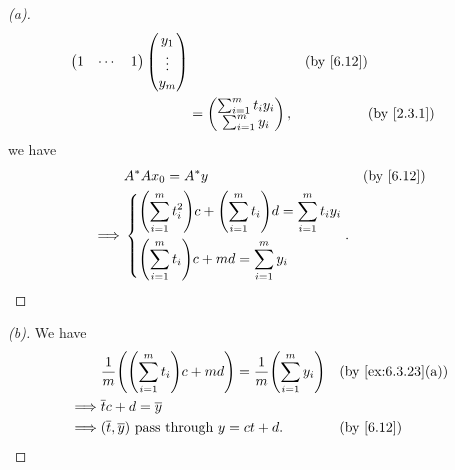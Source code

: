 \begin{proof}[(a)]
\begin{align*}
\begin{pmatrix}
                    1   & \cdots & 1
                  \end{pmatrix} \begin{pmatrix}
                                  y_1    \\
                                  \vdots \\
                                  y_m
                                \end{pmatrix}                                                    &  & \by{6.12} \\
              & = \begin{pmatrix}
                    \sum_{i = 1}^m t_i y_i \\
                    \sum_{i = 1}^m y_i
                  \end{pmatrix},                                                        &  & \by{2.3.1}
  \end{align*}
  we have
  \begin{align*}
             & A^* A x_0 = A^* y                                                                                         &  & \by{6.12} \\
    \implies & \begin{dcases}
                 \pa{\sum_{i = 1}^m t_i^2} c + \pa{\sum_{i = 1}^m t_i} d = \sum_{i = 1}^m t_i y_i \\
                 \pa{\sum_{i = 1}^m t_i} c + md = \sum_{i = 1}^m y_i
               \end{dcases}.
  \end{align*}
\end{proof}

\begin{proof}[(b)]
  We have
  \begin{align*}
             & \frac{1}{m} \pa{\pa{\sum_{i = 1}^m t_i} c + md} = \frac{1}{m} \pa{\sum_{i = 1}^m y_i} &  & \by{ex:6.3.23}[a] \\
    \implies & \overline{t} c + d = \overline{y}                                                                            \\
    \implies & (\overline{t}, \overline{y}) \text{ pass through } y = ct + d.                        &  & \by{6.12}
  \end{align*}
\end{proof}

